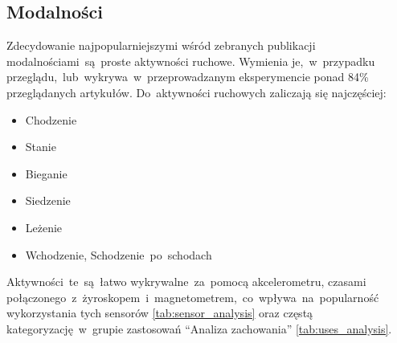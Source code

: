 \subsection{Modalności}
Zdecydowanie najpopularniejszymi wśród zebranych publikacji modalnościami~są~proste aktywności ruchowe. Wymienia je,~w~przypadku przeglądu,~lub~wykrywa~w~przeprowadzanym eksperymencie ponad 84\% przeglądanych artykułów. Do~aktywności ruchowych zaliczają się najczęściej:
\begin{itemize}
    \item Chodzenie
    \item Stanie
    \item Bieganie
    \item Siedzenie
    \item Leżenie
    \item Wchodzenie, Schodzenie~po~schodach
    \label{base_modalities}
\end{itemize}

Aktywności~te~są~łatwo wykrywalne~za~pomocą akcelerometru, czasami połączonego~z~żyroskopem~i~magnetometrem,~co~wpływa~na~popularność wykorzystania tych sensorów \ref{tab:sensor_analysis} oraz częstą kategoryzację~w~grupie zastosowań ``Analiza zachowania'' \ref{tab:uses_analysis}. 


